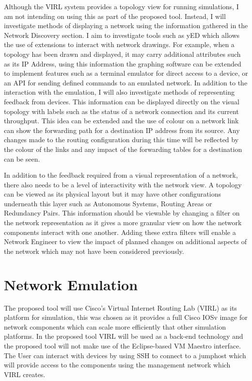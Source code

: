 \documentclass[11pt]{report}
\begin{document}
Although the VIRL system provides a topology view for running simulations, I am not intending on using this as part of the proposed tool. Instead, I will investigate methods of displaying a network using the information gathered in the Network Discovery section. I aim to investigate tools such as yED which allows the use of extensions to interact with network drawings. For example, when a topology has been drawn and displayed, it may carry additional attributes such as its IP Address, using this information the graphing software can be extended to implement features such as a terminal emulator for direct access to a device, or an API for sending defined commands to an emulated network. In addition to the interaction with the emulation, I will also investigate methods of representing feedback from devices. This information can be displayed directly on the visual topology with labels such as the status of a network connection and its current throughput. This idea can be extended and the use of colour on a network link can show the forwarding path for a destination IP address from its source. Any changes made to the routing configuration during this time will be reflected by the colour of the links and any impact of the forwarding tables for a destination can be seen.

In addition to the feedback required from a visual representation of a network, there also needs to be a level of interactivity with the network view. A topology can be viewed as its physical layout but it may have other configurations underneath this layer such as Autonomous Systems, Routing Areas or Redundancy Pairs. This information should be viewable by changing a filter on the network representation as it gives a more granular view on how the network components interact with one another. Adding these extra filters will enable a Network Engineer to view the impact of planned changes on additional aspects of the network which may not have been considered previously.

\section{Network Emulation}

The proposed tool will use Cisco's Virtual Internet Routing Lab (VIRL) as its platform for simulation, this was chosen as it provides a full Cisco IOSv image for network components which can scale more efficiently that other simulation platforms. In the proposed tool VIRL will be used as a back-end technology and the proposed tool will not make use of the Eclipse-based VM Maestro interface. The User can interact with devices by using SSH to connect to a jumphost which will provide access to the components using the management network which VIRL creates. 
\end{document}

